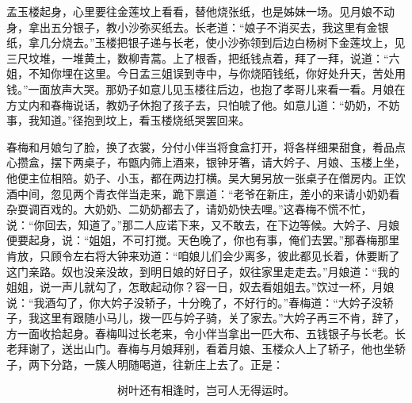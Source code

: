 孟玉楼起身，心里要往金莲坟上看看，替他烧张纸，也是姊妹一场。见月娘不动身，拿出五分银子，教小沙弥买纸去。长老道：“娘子不消买去，我这里有金银纸，拿几分烧去。”玉楼把银子递与长老，使小沙弥领到后边白杨树下金莲坟上，见三尺坟堆，一堆黄土，数柳青蒿。上了根香，把纸钱点着，拜了一拜，说道：“六姐，不知你埋在这里。今日孟三姐误到寺中，与你烧陌钱纸，你好处升天，苦处用钱。”一面放声大哭。那奶子如意儿见玉楼往后边，也抱了孝哥儿来看一看。月娘在方丈内和春梅说话，教奶子休抱了孩子去，只怕唬了他。如意儿道：“奶奶，不妨事，我知道。”径抱到坟上，看玉楼烧纸哭罢回来。

春梅和月娘匀了脸，换了衣裳，分付小伴当将食盒打开，将各样细果甜食，肴品点心攒盒，摆下两桌子，布甑内筛上酒来，银钟牙箸，请大妗子、月娘、玉楼上坐，他便主位相陪。奶子、小玉，都在两边打横。吴大舅另放一张桌子在僧房内。正饮酒中间，忽见两个青衣伴当走来，跪下禀道：“老爷在新庄，差小的来请小奶奶看杂耍调百戏的。大奶奶、二奶奶都去了，请奶奶快去哩。”这春梅不慌不忙，说：“你回去，知道了。”那二人应诺下来，又不敢去，在下边等候。大妗子、月娘便要起身，说：“姐姐，不可打搅。天色晚了，你也有事，俺们去罢。”那春梅那里肯放，只顾令左右将大钟来劝道：“咱娘儿们会少离多，彼此都见长着，休要断了这门亲路。奴也没亲没故，到明日娘的好日子，奴往家里走走去。”月娘道：“我的姐姐，说一声儿就勾了，怎敢起动你？容一日，奴去看姐姐去。”饮过一杯，月娘说：“我酒勾了，你大妗子没轿子，十分晚了，不好行的。”春梅道：“大妗子没轿子，我这里有跟随小马儿，拨一匹与妗子骑，关了家去。”大妗子再三不肯，辞了，方一面收拾起身。春梅叫过长老来，令小伴当拿出一匹大布、五钱银子与长老。长老拜谢了，送出山门。春梅与月娘拜别，看着月娘、玉楼众人上了轿子，他也坐轿子，两下分路，一簇人明随喝道，往新庄上去了。正是：

\[
树叶还有相逢时，岂可人无得运时。
\]
